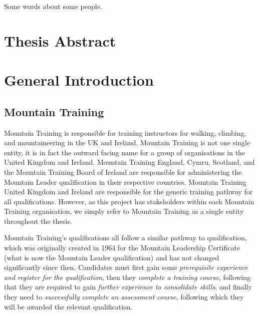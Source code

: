 \documentclass[
  12pt,
  a4paper,
]{book}
\begin{document}
Some words about some people.

{
\setcounter{tocdepth}{2}
\tableofcontents
}
\listoftables
{}

\listoffigures
{}

\mainmatter
\setcounter{page}{1}

\hypertarget{thesis-abstract}{%
\chapter*{Thesis Abstract}\label{thesis-abstract}}

\hypertarget{gen-intro}{%
\chapter{General Introduction}\label{gen-intro}}

\hypertarget{mountain-training}{%
\section{Mountain Training}\label{mountain-training}}

Mountain Training is responsible for training instructors for walking, climbing, and mountaineering in the UK and Ireland. Mountain Training is not one single entity, it is in fact the outward facing name for a group of organisations in the United Kingdom and Ireland. Mountain Training England, Cymru, Scotland, and the Mountain Training Board of Ireland are responsible for administering the Mountain Leader qualification in their respective countries. Mountain Training United Kingdom and Ireland are responsible for the generic training pathway for all qualifications. However, as this project has stakeholders within each Mountain Training organisation, we simply refer to Mountain Training as a single entity throughout the thesis.

Mountain Training's qualifications all follow a similar pathway to qualification, which was originally created in 1964 for the Mountain Leadership Certificate (what is now the Mountain Leader qualification) and has not changed significantly since then. Candidates must first gain some \emph{prerequisite experience and register for the qualification}, then they \emph{complete a training course}, following that they are required to gain \emph{further experience to consolidate skills}, and finally they need to \emph{successfully complete an assessment course}, following which they will be awarded the relevant qualification.
\end{document}
